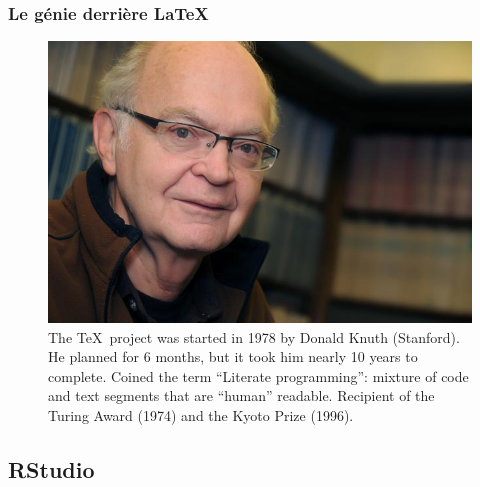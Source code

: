 \documentclass[10pt]{beamer}\usepackage[]{graphicx}\usepackage[]{color}
\begin{document}

\begin{frame}\frametitle{Le génie derrière \LaTeX}

\begin{figure}[h!]
\centering
\includegraphics[scale=0.4, keepaspectratio]{./don}
\small
\caption{The \TeX~project was started in 1978 by Donald Knuth (Stanford). He planned for 6 months, but it took him nearly 10 years to complete. Coined the term ``Literate programming'': mixture of code and text segments that are ``human'' readable. Recipient of the Turing Award (1974) and the Kyoto Prize (1996).}
\label{fig:don}
\end{figure}

\end{frame}



\subsection{RStudio}
\end{document}
